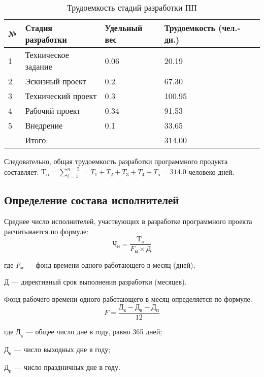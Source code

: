 \begin{table}[H]
\caption{Трудоемкость стадий разработки ПП}
\begin{tabular}{|l|p{7cm}|p{4cm}|p{4cm}|}
\hline{}
№ & Стадия разработки & Удельный вес & Трудоемкость (чел.- дн.) \\
\hline{}
1 & Техническое задание & 0.06 &  20.19 \\
\hline{}
2 & Эскизный проект & 0.2 & 67.30 \\
\hline{}
3 & Технический проект & 0.3 & 100.95 \\
\hline{}
4 & Рабочий проект & 0.34 & 91.53 \\
\hline{}
5 & Внедрение & 0.1 & 33.65 \\
\hline{}
& Итого: & & 314.00  \\
\hline
\end{tabular}
\label{table:trdSoftDev}
\end{table}
Следовательно, общая трудоемкость разработки программного продукта
составляет: $\textrm{T}_{\textrm{o}} = \sum_{i=1}^{n=5} = T_1 + T_2 + T_3 + T_4 + T_5 = 314.0$ человеко-дней.


\subsection{Определение состава исполнителей}
Среднее число исполнителей, участвующих в разработке программного проекта расчитывается по формуле:
\begin{equation}
    \textrm{Ч}_{\textrm{и}} =\frac{\textrm{T}_{\textrm{o}}}{F_{\textrm{м}}\times{}\textrm{Д}}
\end{equation}
\begin{ESKDexplanation}
    \item[где ]{} $F_{\textrm{м}}$ --- фонд времени одного работающего в месяц (дней);
    \item{} $\textrm{Д}$ --- директивный срок выполнения разработки (месяцев).
\end{ESKDexplanation}
Фонд рабочего времени одного работающего в месяц определяется по формуле:
\begin{equation}
    F = \frac{ \textrm{Д}_{\textrm{к}} - \textrm{Д}_{\textrm{в}} - \textrm{Д}_{\textrm{п}}   }{12}
\end{equation}
\begin{ESKDexplanation}
    \item[где ]{} $\textrm{Д}_{\textrm{к}}$ --- общее число дне в году, равно 365 дней;
    \item{} $\textrm{Д}_{\textrm{в}}$ --- число выходных дне в году;
    \item{} $\textrm{Д}_{\textrm{п}}$ --- число праздничных дне в году.
\end{ESKDexplanation}



